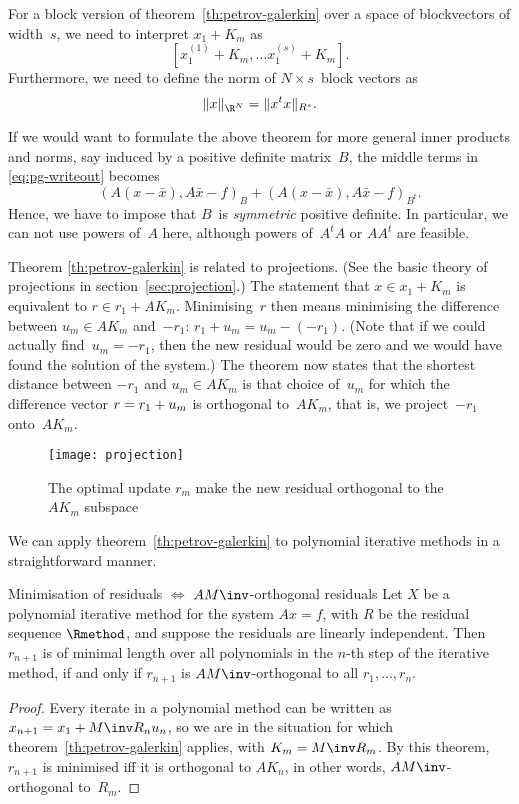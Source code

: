 \begin{block}
For a block version of theorem~\ref{th:petrov-galerkin}
over a space of blockvectors of width~$s$,
we need to interpret $x_1+K_m$
as \[ [ x_1^{(1)}+K_m,\ldots x_1^{(s)}+K_m]. \]
Furthermore, we need to define the norm of $N\times s$~block vectors as
\[ \|x\|_{\R^N}=\|x^tx\|_{R^s}. \]
\end{block}

\begin{remark}
If we would want to formulate the above theorem for more general inner
products and norms, say induced by a positive definite matrix~$B$, the
middle terms in \eqref{eq:pg-writeout} becomes
\[ (A(x-\bar x),A\bar x-f)_B+(A(x-\bar x),A\bar x-f)_{B^t}. \]
Hence, we have to impose that $B$~is {\em symmetric} positive
definite. In particular, we can not use powers of~$A$ here, although
powers of~$A^tA$ or $AA^t$ are feasible.
\end{remark}

Theorem \ref{th:petrov-galerkin} is related to projections. (See the
basic theory of projections in section~\ref{sec:projection}.) The
statement that $x\in x_1+K_m$ is equivalent to $r\in r_1+AK_m$.
Minimising~$r$ then means minimising the difference between $u_m\in
AK_m$ and~$-r_1$: $r_1+u_m=u_m-(-r_1)$.  (Note that if we could
actually find~$u_m=-r_1$, then the new residual would be zero and we
would have found the solution of the system.)  The theorem now states
that the shortest distance between $-r_1$ and $u_m\in AK_m$ is that
choice of~$u_m$ for which the difference vector $r=\nobreak r_1+u_m$
is orthogonal to~$AK_m$, that is, we project~$-r_1$ onto~$AK_m$.
\begin{figure}[ht]
\texttt{[image: projection]}
\caption{The optimal update $r_m$ make the new residual orthogonal to
the $AK_m$ subspace}
\end{figure}


We can apply theorem~\ref{th:petrov-galerkin} to polynomial iterative methods
in a straightforward manner.

\begin{ccorollary}{Minimisation of residuals $\Leftrightarrow$ 
$AM\inv$-orthogonal residuals}
\label{th:gmres}
Let $X$ be a polynomial iterative method for the system $Ax=f$,
with  $R$ be the residual sequence $\Rmethod$, and suppose
the residuals are linearly independent.
Then $r_{n+1}$ is of minimal length over all polynomials
in the $n$-th step of the iterative method,
if and only if $r_{n+1}$ is $AM\inv$-orthogonal to all $r_1,\ldots,r_n$.
\end{ccorollary}
\begin{proof}
Every iterate 
in a polynomial method can be written as $x_{n+1}=x_1+M\inv R_nu_n$,
so we are in the situation for which theorem~\ref{th:petrov-galerkin} applies,
with $K_m=M\inv R_m$.
By this theorem, $r_{n+1}$ is minimised
iff it is orthogonal to $AK_n$, in other words, $AM\inv $-orthogonal
to~$R_m$.
\end{proof}

